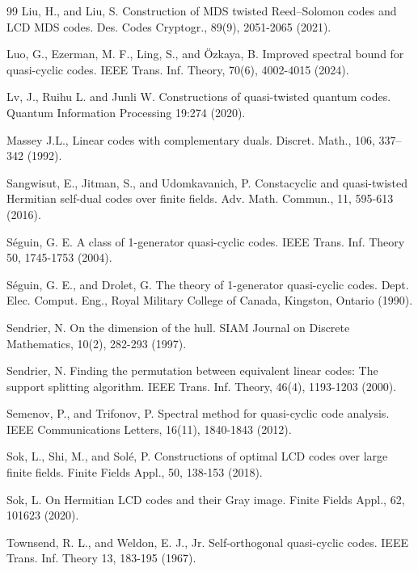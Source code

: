 \documentclass[a4paper,12pt]{article}
\begin{document}
\begin{thebibliography}{99}
Liu, H., and Liu, S. Construction of MDS twisted Reed–Solomon codes and LCD MDS codes. 
Des. Codes Cryptogr., 89(9), 2051-2065 (2021). 
 



 Luo, G., Ezerman, M. F., Ling, S., and Özkaya, B.  Improved spectral bound for quasi-cyclic codes. 
IEEE Trans. Inf. Theory, 70(6), 4002-4015 (2024).

 Lv, J., Ruihu L. and Junli W. Constructions of quasi-twisted quantum codes. Quantum Information Processing 19:274 (2020).

 Massey J.L., Linear codes with complementary duals. Discret. Math., 106, 337–342 (1992).

 Sangwisut, E., Jitman, S., and Udomkavanich, P. Constacyclic and quasi-twisted Hermitian self-dual codes over finite fields.  Adv. Math. Commun., 11, 595-613 (2016).

 S\'eguin, G. E.  A class of 1-generator quasi-cyclic codes. 
IEEE Trans. Inf. Theory 50,  1745-1753 (2004).

 S\'eguin, G. E., and Drolet,  G. The theory of 1-generator quasi-cyclic codes.  Dept.
 Elec. Comput. Eng., Royal Military College of Canada, Kingston, Ontario (1990).

 Sendrier, N. On the dimension of the hull. SIAM Journal on Discrete Mathematics, 10(2), 282-293 (1997). 

  Sendrier, N.  Finding the permutation between equivalent linear codes: The support splitting algorithm. 
IEEE Trans. Inf. Theory, 46(4), 1193-1203 (2000).

Semenov, P., and Trifonov, P.  Spectral method for quasi-cyclic code analysis. IEEE Communications Letters, 16(11), 1840-1843 (2012).

Sok, L., Shi, M., and Solé, P. Constructions of optimal LCD codes over large finite fields. 
Finite Fields Appl., 50, 138-153 (2018). 

 Sok, L. On Hermitian LCD codes and their Gray image. 
Finite Fields Appl., 62, 101623 (2020).




 Townsend, R. L., and Weldon, E. J., Jr. 
Self-orthogonal quasi-cyclic codes.
IEEE Trans. Inf. Theory 13, 183-195 (1967).


\end{thebibliography}
\end{document}
